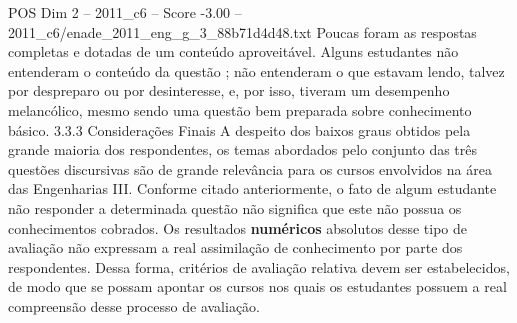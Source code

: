 \begin{textsample}{POS Dim 2 – 2011\_c6 – Score -3.00 – 2011\_c6/enade\_2011\_eng\_g\_3\_88b71d4d48.txt}
Poucas foram as respostas completas e dotadas de um conteúdo aproveitável.
Alguns estudantes não entenderam o conteúdo da questão ; não entenderam o que estavam lendo, talvez por despreparo ou por desinteresse, e, por isso, tiveram um desempenho melancólico, mesmo sendo uma questão bem preparada sobre conhecimento básico. 3.3.3 Considerações Finais A despeito dos baixos graus obtidos pela grande maioria dos respondentes, os temas abordados pelo conjunto das três questões discursivas são de grande relevância para os cursos envolvidos na área das Engenharias III.
Conforme citado anteriormente, o fato de algum estudante não responder a determinada questão não significa que este não possua os conhecimentos cobrados.
Os resultados \textbf{numéricos} absolutos desse tipo de avaliação não expressam a real assimilação de conhecimento por parte dos respondentes.
Dessa forma, critérios de avaliação relativa devem ser estabelecidos, de modo que se possam apontar os cursos nos quais os estudantes possuem a real compreensão desse processo de avaliação.

\end{textsample}
